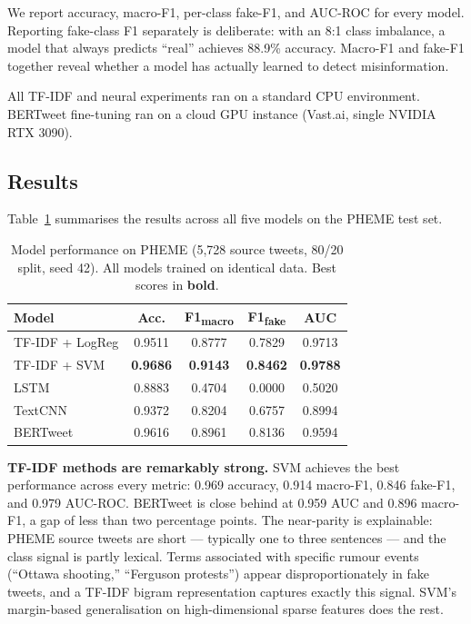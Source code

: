 \documentclass[sigconf]{acmart}
\begin{document}
We report accuracy, macro-F1, per-class fake-F1, and AUC-ROC for every model. Reporting
fake-class F1 separately is deliberate: with an 8:1 class imbalance, a model that always
predicts ``real'' achieves 88.9\% accuracy. Macro-F1 and fake-F1 together reveal whether
a model has actually learned to detect misinformation.

All TF-IDF and neural experiments ran on a standard CPU environment. BERTweet fine-tuning
ran on a cloud GPU instance (Vast.ai, single NVIDIA RTX 3090).

\subsection{Results}

Table~\ref{tab:results} summarises the results across all five models on the PHEME test set.

\begin{table}[h]
\centering
\caption{Model performance on PHEME (5,728 source tweets, 80/20 split, seed 42).
         All models trained on identical data. Best scores in \textbf{bold}.}
\label{tab:results}
\begin{tabular}{lcccc}
\toprule
\textbf{Model} & \textbf{Acc.} & \textbf{F1\textsubscript{macro}} & \textbf{F1\textsubscript{fake}} & \textbf{AUC} \\
\midrule
TF-IDF + LogReg & 0.9511 & 0.8777 & 0.7829 & 0.9713 \\
TF-IDF + SVM    & \textbf{0.9686} & \textbf{0.9143} & \textbf{0.8462} & \textbf{0.9788} \\
LSTM            & 0.8883 & 0.4704 & 0.0000 & 0.5020 \\
TextCNN         & 0.9372 & 0.8204 & 0.6757 & 0.8994 \\
BERTweet        & 0.9616 & 0.8961 & 0.8136 & 0.9594 \\
\bottomrule
\end{tabular}
\end{table}

\textbf{TF-IDF methods are remarkably strong.} SVM achieves the best performance across
every metric: 0.969 accuracy, 0.914 macro-F1, 0.846 fake-F1, and 0.979 AUC-ROC.
BERTweet is close behind at 0.959 AUC and 0.896 macro-F1, a gap of less than two
percentage points. The near-parity is explainable: PHEME source tweets are short —
typically one to three sentences — and the class signal is partly lexical. Terms associated
with specific rumour events (``Ottawa shooting,'' ``Ferguson protests'') appear disproportionately
in fake tweets, and a TF-IDF bigram representation captures exactly this signal. SVM's
margin-based generalisation on high-dimensional sparse features does the rest.
\end{document}
